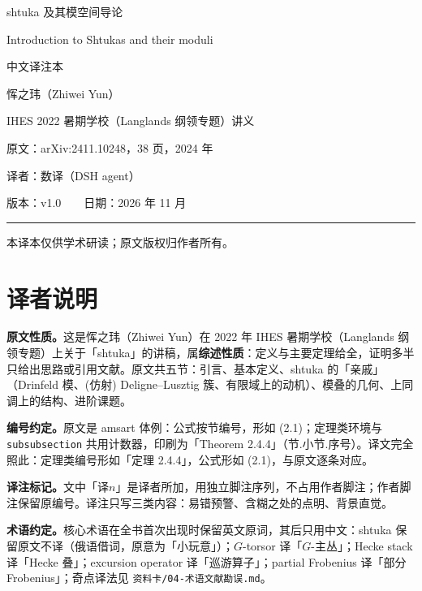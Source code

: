 \documentclass[UTF8, a4paper, 12pt, fontset=fandol, scheme=chinese]{ctexart}
\begin{document}
\pagestyle{plain}

\begin{titlepage}
\centering
\vspace*{3cm}
{\Huge shtuka 及其模空间导论\par}
\vspace{1.2cm}
{\LARGE Introduction to Shtukas and their moduli\par}
\vspace{1.2cm}
{\large 中文译注本\par}
\vspace{2cm}
{\large 恽之玮（Zhiwei Yun）\par}
\vspace{0.6cm}
{\large IHES 2022 暑期学校（Langlands 纲领专题）讲义\par}
\vspace{1.6cm}
{\large 原文：arXiv:2411.10248，38 页，2024 年\par}
\vspace{0.4cm}
{\large 译者：数译（DSH agent）\par}
\vspace{0.4cm}
{\large 版本：v1.0　　日期：2026 年 11 月\par}
\vspace{1.6cm}
\rule{0.6\textwidth}{0.4pt}\par
\vspace{0.6cm}
{\small 本译本仅供学术研读；原文版权归作者所有。\par}
\vfill
\end{titlepage}

\section*{译者说明}

\textbf{原文性质。}这是恽之玮（Zhiwei Yun）在 2022 年 IHES 暑期学校（Langlands 纲领专题）上关于「shtuka」的讲稿，属\textbf{综述性质}：定义与主要定理给全，证明多半只给出思路或引用文献。原文共五节：引言、基本定义、shtuka 的「亲戚」（Drinfeld 模、(仿射) Deligne–Lusztig 簇、有限域上的动机）、模叠的几何、上同调上的结构、进阶课题。

\textbf{编号约定。}原文是 amsart 体例：公式按节编号，形如 (2.1)；定理类环境与 \verb|subsubsection| 共用计数器，印刷为「Theorem 2.4.4」（节.小节.序号）。译文完全照此：定理类编号形如「定理 2.4.4」，公式形如 (2.1)，与原文逐条对应。

\textbf{译注标记。}文中「译$n$」是译者所加，用独立脚注序列，不占用作者脚注；作者脚注保留原编号。译注只写三类内容：易错预警、含糊之处的点明、背景直觉。

\textbf{术语约定。}核心术语在全书首次出现时保留英文原词，其后只用中文：shtuka 保留原文不译（俄语借词，原意为「小玩意」）；$G$-torsor 译「$G$-主丛」；Hecke stack 译「Hecke 叠」；excursion operator 译「巡游算子」；partial Frobenius 译「部分 Frobenius」；奇点译法见 \verb|资料卡/04-术语文献勘误.md|。

\newpage
\tableofcontents
\newpage







\end{document}
